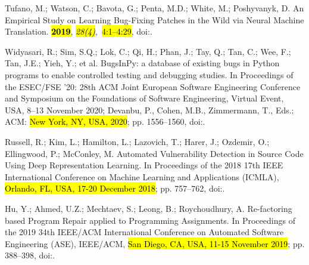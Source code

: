 \documentclass[mathematics,review,accept,moreauthors,pdftex]{Definitions/mdpi}
\begin{document}
\begin{thebibliography}{999}
Tufano, M.; Watson, C.; Bavota, G.; Penta, M.D.; White, M.; Poshyvanyk, D.
\newblock An Empirical Study on Learning Bug-Fixing Patches in the Wild via
  Neural Machine Translation.
 {\bf \hl{2019}}, {\em \hl{28(4)}},~\hl{4:1--4:29},
\newblock
  doi:{\href{https://doi.org/https://doi.org/10.1145/3340544}{}}.

Widyasari, R.; Sim, S.Q.; Lok, C.; Qi, H.; Phan, J.; Tay, Q.; Tan, C.; Wee, F.;
  Tan, J.E.; Yieh, Y.; et al.
\newblock BugsInPy: a database of existing bugs in Python programs to enable
  controlled testing and debugging studies.
\newblock In Proceedings of the {ESEC/FSE} '20: 28th {ACM} Joint European Software Engineering
  Conference and Symposium on the Foundations of Software Engineering, Virtual
  Event, USA, 8--13 November 2020; Devanbu, P., Cohen, M.B., Zimmermann, T.,
  Eds.; {ACM}:  \hl{New York, NY, USA, 2020}; pp. 1556--1560,
\newblock
  doi:{\href{https://doi.org/10.1145/3368089.3417943}{}}.

{Russell}, R.; {Kim}, L.; {Hamilton}, L.; {Lazovich}, T.; {Harer}, J.;
  {Ozdemir}, O.; {Ellingwood}, P.; {McConley}, M.
\newblock Automated Vulnerability Detection in Source Code Using Deep
  Representation Learning.
\newblock In Proceedings of the 2018 17th IEEE International Conference on Machine Learning and
  Applications (ICMLA),  \hl{Orlando, FL, USA, 17-20 December 2018}; pp. 757--762,
\newblock
  doi:{\href{https://doi.org/10.1109/ICMLA.2018.00120}{}}.

Hu, Y.; Ahmed, U.Z.; Mechtaev, S.; Leong, B.; Roychoudhury, A.
\newblock Re-factoring based Program Repair applied to Programming Assignments.
\newblock In Proceedings of the 2019 34th IEEE/ACM International Conference on Automated Software
  Engineering (ASE), IEEE/ACM,  \hl{San Diego, CA, USA, 11-15 November 2019}; pp. 388--398,
\newblock
  doi:{\href{https://doi.org/10.1109/ASE.2019.00044}{}}.


\end{thebibliography}
\end{document}

